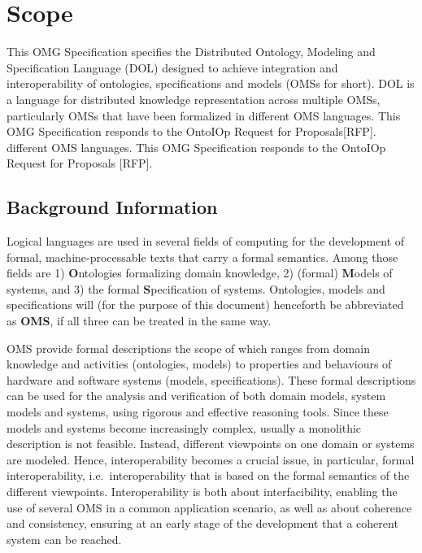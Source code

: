 \documentclass[10pt,%
\ifpretendfinal
final%
\else
draft%
\fi,
]{scrreprt}
\newcommand*{\nitem}[1]{[#1]}
\newcommand*{\IS}{OMG Specification\xspace}
\begin{document}
\chapter{Scope}
This \IS specifies the Distributed Ontology, Modeling and Specification
 Language (DOL) designed to achieve integration and interoperability of
ontologies, specifications and models (OMSs for short). DOL is a language for
distributed knowledge representation across multiple OMSs, particularly OMSs
 that have been formalized in different OMS languages. This \IS responds to the
OntoIOp Request for Proposals\nitem{RFP}.
different OMS languages. This \IS responds to the OntoIOp Request for
Proposals \nitem{RFP}.



\section{Background Information}
Logical languages are used in several fields of computing for the development of formal, machine-processable texts that carry a formal semantics. Among those fields are 1) \textbf{O}ntologies formalizing domain knowledge, 2) (formal) \textbf{M}odels of systems, and 3) the formal \textbf{S}pecification of systems. Ontologies, models  and specifications will (for the purpose of this document) henceforth be abbreviated as \textbf{OMS}, if all three can be treated in the same way.

OMS provide formal descriptions the scope of which ranges from domain
knowledge and activities (ontologies, models) to properties and
behaviours of hardware and software systems (models, specifications).
These formal descriptions can be used for the analysis and
verification of both domain models, system models and systems, using
rigorous and effective reasoning tools.  Since these models and
systems become increasingly complex, usually a monolithic description
is not feasible. Instead, different viewpoints on one domain or
systems are modeled.  Hence, interoperability becomes a crucial issue,
in particular, formal interoperability, i.e.\ interoperability that is
based on the formal semantics of the different viewpoints.
Interoperability is both about interfacibility, enabling the use of
several OMS in a common application scenario, as well as about
coherence and consistency, ensuring at an early stage of the
development that a coherent system can be reached.
\end{document}
